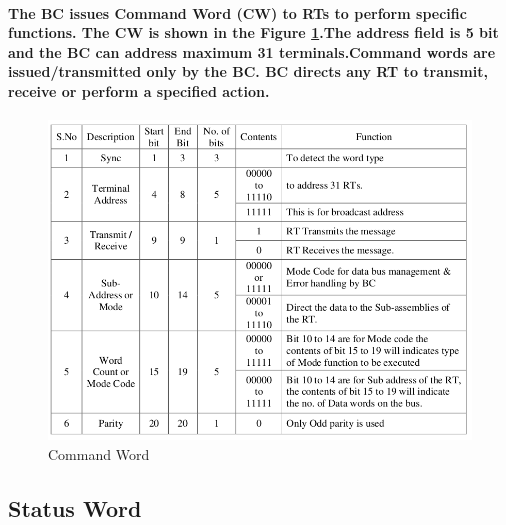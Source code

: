 \documentclass[12pt,a4paper]{report}
\begin{document}
\paragraph{\textrm{\textmd{ The BC issues Command Word (CW) to RTs to perform specific functions. The CW is shown in the Figure \ref{fig:cmd}.The address field is 5 bit and the BC can address maximum 31 terminals.Command words are issued/transmitted only by the BC. BC directs any RT to transmit, receive or perform a specified action.}}}
\begin{figure}[h]
	\centering
	\includegraphics[scale=.4]{command.png}
	\caption{Command Word}
	\label{fig:cmd}
\end{figure}
\subsection{Status Word}
\end{document}
